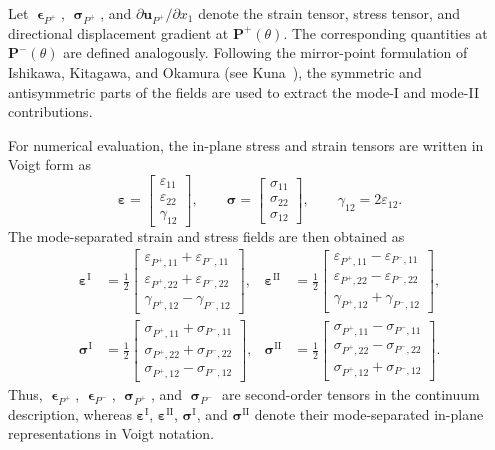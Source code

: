\documentclass[smallextended]{svjour3}       %
\newcommand{\vb}[1]{\bm{#1}}      %
\begin{document}
Let \(\bm{\upvarepsilon}_{P^{+}}\), \(\bm{\upsigma}_{P^{+}}\), and
\(\partial\vb u_{P^{+}}/\partial x_1\) denote the strain tensor, stress tensor,
and directional displacement gradient at \(\vb P^{+}(\theta)\). The
corresponding quantities at \(\vb P^{-}(\theta)\) are defined analogously.
Following the mirror-point formulation of Ishikawa, Kitagawa, and Okamura (see Kuna~\cite{Kuna2013}),
the symmetric and antisymmetric parts of the fields are used to extract the
mode-I and mode-II contributions.

For numerical evaluation, the in-plane stress and strain tensors are written
in Voigt form as
\[
\vb\varepsilon=
\begin{bmatrix}
	\varepsilon_{11}\\
	\varepsilon_{22}\\
	\gamma_{12}
\end{bmatrix},
\qquad
\vb\sigma=
\begin{bmatrix}
	\sigma_{11}\\
	\sigma_{22}\\
	\sigma_{12}
\end{bmatrix},
\qquad
\gamma_{12}=2\varepsilon_{12}.
\]
The mode-separated strain and stress fields are then obtained as
\begin{align}
	\vb\varepsilon^{\mathrm I}
	&=
	\frac12
	\begin{bmatrix}
		\varepsilon_{P^{+},11}+\varepsilon_{P^{-},11}\\
		\varepsilon_{P^{+},22}+\varepsilon_{P^{-},22}\\
		\gamma_{P^{+},12}-\gamma_{P^{-},12}
	\end{bmatrix},
	&
	\vb\varepsilon^{\mathrm{II}}
	&=
	\frac12
	\begin{bmatrix}
		\varepsilon_{P^{+},11}-\varepsilon_{P^{-},11}\\
		\varepsilon_{P^{+},22}-\varepsilon_{P^{-},22}\\
		\gamma_{P^{+},12}+\gamma_{P^{-},12}
	\end{bmatrix},
	\nonumber\\[4pt]
	\vb\sigma^{\mathrm I}
	&=
	\frac12
	\begin{bmatrix}
		\sigma_{P^{+},11}+\sigma_{P^{-},11}\\
		\sigma_{P^{+},22}+\sigma_{P^{-},22}\\
		\sigma_{P^{+},12}-\sigma_{P^{-},12}
	\end{bmatrix},
	&
	\vb\sigma^{\mathrm{II}}
	&=
	\frac12
	\begin{bmatrix}
		\sigma_{P^{+},11}-\sigma_{P^{-},11}\\
		\sigma_{P^{+},22}-\sigma_{P^{-},22}\\
		\sigma_{P^{+},12}+\sigma_{P^{-},12}
	\end{bmatrix}.
	\label{eq:mode_sep}
\end{align}
Thus, \(\bm{\upvarepsilon}_{P^{+}}\), \(\bm{\upvarepsilon}_{P^{-}}\),
\(\bm{\upsigma}_{P^{+}}\), and \(\bm{\upsigma}_{P^{-}}\) are second-order tensors in the
continuum description, whereas
\(\vb\varepsilon^{\mathrm I}\), \(\vb\varepsilon^{\mathrm{II}}\),
\(\vb\sigma^{\mathrm I}\), and \(\vb\sigma^{\mathrm{II}}\) denote their
mode-separated in-plane representations in Voigt notation.
\end{document}
